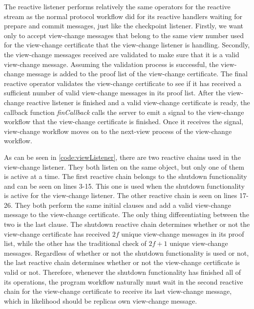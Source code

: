 The reactive listener performs relatively the same operators for the reactive stream as the normal protocol workflow did for its reactive handlers waiting for prepare and commit messages, just like the checkpoint listener. Firstly, we want only to accept view-change messages that belong to the same view number used for the view-change certificate that the view-change listener is handling. Secondly, the view-change messages received are validated to make sure that it is a valid view-change message. Assuming the validation process is successful, the view-change message is added to the proof list of the view-change certificate. The final reactive operator validates the view-change certificate to see if it has received a sufficient number of valid view-change messages in its proof list. After the view-change reactive listener is finished and a valid view-change certificate is ready, the callback function \emph{finCallback} calls the server to emit a signal to the view-change workflow that the view-change certificate is finished. Once it receives the signal, view-change workflow moves on to the next-view process of the view-change workflow. 

As can be seen in \autoref{code:viewListener}, there are two reactive chains used in the view-change listener. They both listen on the same  object, but only one of them is active at a time. The first reactive chain belongs to the shutdown functionality and can be seen on lines 3-15. This one is used when the shutdown functionality is active for the view-change listener. The other reactive chain is seen on lines 17-26. They both perform the same initial  clauses and add a valid view-change message to the view-change certificate. The only thing differentiating between the two is the last  clause. The shutdown reactive chain determines whether or not the view-change certificate has received $2f$ unique view-change messages in its proof list, while the other has the traditional check of $2f+1$ unique view-change messages. Regardless of whether or not the shutdown functionality is used or not, the last reactive chain determines whether or not the view-change certificate is valid or not. Therefore, whenever the shutdown functionality has finished all of its operations, the program workflow naturally must wait in the second reactive chain for the view-change certificate to receive its last view-change message, which in likelihood should be replicas own view-change message.

